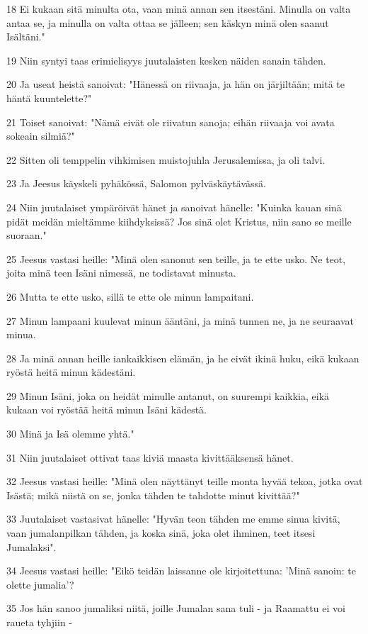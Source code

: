 \par 18 Ei kukaan sitä minulta ota, vaan minä annan sen itsestäni. Minulla on valta antaa se, ja minulla on valta ottaa se jälleen; sen käskyn minä olen saanut Isältäni."
\par 19 Niin syntyi taas erimielisyys juutalaisten kesken näiden sanain tähden.
\par 20 Ja useat heistä sanoivat: "Hänessä on riivaaja, ja hän on järjiltään; mitä te häntä kuuntelette?"
\par 21 Toiset sanoivat: "Nämä eivät ole riivatun sanoja; eihän riivaaja voi avata sokeain silmiä?"
\par 22 Sitten oli temppelin vihkimisen muistojuhla Jerusalemissa, ja oli talvi.
\par 23 Ja Jeesus käyskeli pyhäkössä, Salomon pylväskäytävässä.
\par 24 Niin juutalaiset ympäröivät hänet ja sanoivat hänelle: "Kuinka kauan sinä pidät meidän mieltämme kiihdyksissä? Jos sinä olet Kristus, niin sano se meille suoraan."
\par 25 Jeesus vastasi heille: "Minä olen sanonut sen teille, ja te ette usko. Ne teot, joita minä teen Isäni nimessä, ne todistavat minusta.
\par 26 Mutta te ette usko, sillä te ette ole minun lampaitani.
\par 27 Minun lampaani kuulevat minun ääntäni, ja minä tunnen ne, ja ne seuraavat minua.
\par 28 Ja minä annan heille iankaikkisen elämän, ja he eivät ikinä huku, eikä kukaan ryöstä heitä minun kädestäni.
\par 29 Minun Isäni, joka on heidät minulle antanut, on suurempi kaikkia, eikä kukaan voi ryöstää heitä minun Isäni kädestä.
\par 30 Minä ja Isä olemme yhtä."
\par 31 Niin juutalaiset ottivat taas kiviä maasta kivittääksensä hänet.
\par 32 Jeesus vastasi heille: "Minä olen näyttänyt teille monta hyvää tekoa, jotka ovat Isästä; mikä niistä on se, jonka tähden te tahdotte minut kivittää?"
\par 33 Juutalaiset vastasivat hänelle: "Hyvän teon tähden me emme sinua kivitä, vaan jumalanpilkan tähden, ja koska sinä, joka olet ihminen, teet itsesi Jumalaksi".
\par 34 Jeesus vastasi heille: "Eikö teidän laissanne ole kirjoitettuna: 'Minä sanoin: te olette jumalia'?
\par 35 Jos hän sanoo jumaliksi niitä, joille Jumalan sana tuli - ja Raamattu ei voi raueta tyhjiin -
